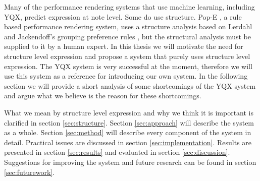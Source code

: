 \documentclass[a4paper,10pt]{article}
\begin{document}
Many of the performance rendering systems that use machine learning, including YQX, predict expression at note level. Some do use structure. Pop-E \cite{hashida2006pop}, a rule based performance rendering system, uses a structure analysis based on Lerdahl and Jackendoff's grouping preference rules \cite{lerdahl1996generative}, but the structural analysis must be supplied to it by a human expert. In this thesis we will motivate the need for structure level expression and propose a system that purely uses structure level expression. The YQX system is very successful at the moment, therefore we will use this system as a reference for introducing our own system. In the following section we will provide a short analysis of some shortcomings of the YQX system and argue what we believe is the reason for these shortcomings.

What we mean by structure level expression and why we think it is important is clarified in section \ref{sec:structure}. Section \ref{sec:approach} will describe the system as a whole. Section \ref{sec:method} will describe every component of the system in detail. Practical issues are discussed in section \ref{sec:implementation}. Results are presented in section \ref{sec:results} and evaluated in section \ref{sec:discussion}. Suggestions for improving the system and future research can be found in section \ref{sec:futurework}.



\end{document}
